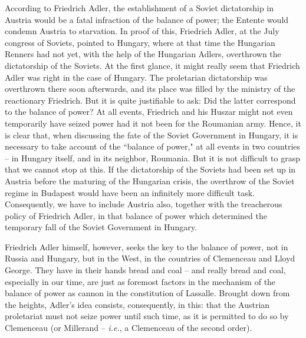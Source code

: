 \documentclass[12pt]{article}
\begin{document}
\vspace{12pt}
According to Friedrich Adler, the establishment of a Soviet
dictatorship in Austria would be a fatal infraction of the balance of
power; the Entente would condemn Austria to starvation. In proof of
this, Friedrich Adler, at the July congress of Soviets, pointed to
Hungary, where at that time the Hungarian Renners had not yet, with
the help of the Hungarian Adlers, overthrown the dictatorship of the
Soviets. At the first glance, it might really seem that Friedrich
Adler was right in the case of Hungary. The proletarian dictatorship
was overthrown there soon afterwards, and its place was filled by the
ministry of the reactionary Friedrich. But it is quite justifiable to
ask: Did the latter correspond to the balance of power? At all events,
Friedrich and his Huszar might not even temporarily have seized power
had it not been for the Roumanian army. Hence, it is clear that, when
discussing the fate of the Soviet Government in Hungary, it is
necessary to take account of the ``balance of power," at all events in
two countries -- in Hungary itself, and in its neighbor, Roumania. But
it is not difficult to grasp that we cannot stop at this. If the
dictatorship of the Soviets had been set up in Austria before the
maturing of the Hungarian crisis, the overthrow of the Soviet regime
in Budapest would have been an infinitely more difficult task.
Consequently, we have to include Austria also, together with the
treacherous policy of Friedrich Adler, in that balance of power which
determined the temporary fall of the Soviet Government in Hungary.

\vspace{12pt}
Friedrich Adler himself, however, seeks the key to the balance of
power, not in Russia and Hungary, but in the West, in the countries of
Clemenceau and Lloyd George. They have in their hands bread and
coal -- and really bread and coal, especially in our time, are just as
foremost factors in the mechanism of the balance of power as cannon in
the constitution of Lassalle. Brought down from the heights, Adler's
idea consists, consequently, in this: that the Austrian proletariat
must not seize power until such time, as it is permitted to do so by
Clemenceau (or Millerand -- \emph{i.e.}, a Clemenceau of the second
order).
\end{document}
